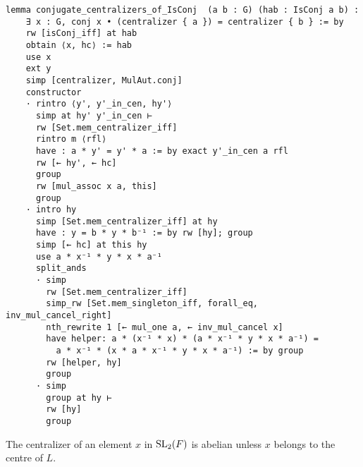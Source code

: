 \begin{footnotesize}
\begin{verbatim}
lemma conjugate_centralizers_of_IsConj  (a b : G) (hab : IsConj a b) :
    ∃ x : G, conj x • (centralizer { a }) = centralizer { b } := by
    rw [isConj_iff] at hab
    obtain ⟨x, hc⟩ := hab
    use x
    ext y
    simp [centralizer, MulAut.conj]
    constructor
    · rintro ⟨y', y'_in_cen, hy'⟩
      simp at hy' y'_in_cen ⊢
      rw [Set.mem_centralizer_iff]
      rintro m ⟨rfl⟩
      have : a * y' = y' * a := by exact y'_in_cen a rfl
      rw [← hy', ← hc]
      group
      rw [mul_assoc x a, this]
      group
    · intro hy
      simp [Set.mem_centralizer_iff] at hy
      have : y = b * y * b⁻¹ := by rw [hy]; group
      simp [← hc] at this hy
      use a * x⁻¹ * y * x * a⁻¹
      split_ands
      · simp
        rw [Set.mem_centralizer_iff]
        simp_rw [Set.mem_singleton_iff, forall_eq, inv_mul_cancel_right]
        nth_rewrite 1 [← mul_one a, ← inv_mul_cancel x]
        have helper: a * (x⁻¹ * x) * (a * x⁻¹ * y * x * a⁻¹) =
          a * x⁻¹ * (x * a * x⁻¹ * y * x * a⁻¹) := by group
        rw [helper, hy]
        group
      · simp
        group at hy ⊢
        rw [hy]
        group
\end{verbatim}
\end{footnotesize}



\begin{corollary}
    \label{IsCommutative_centralizer_of_not_mem_center}
    \leanok
The centralizer of an element $x$ in $\operatorname{SL}_2(F)$ is abelian unless $x$ belongs to the centre of $L$. \vspace{3mm}
\end{corollary}


